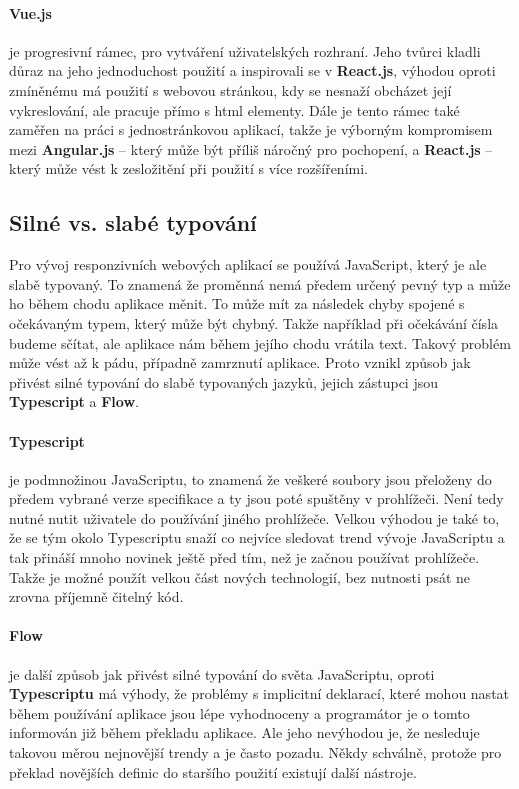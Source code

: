 \paragraph{Vue.js} je progresivní rámec, pro vytváření uživatelských rozhraní. Jeho tvůrci kladli důraz na jeho jednoduchost použití a inspirovali se v \textbf{React.js}, výhodou oproti zmíněnému má použití s webovou stránkou, kdy se nesnaží obcházet její vykreslování, ale pracuje přímo s html elementy. Dále je tento rámec také zaměřen na práci s jednostránkovou aplikací, takže je výborným kompromisem mezi \textbf{Angular.js} -- který může být příliš náročný pro pochopení, a \textbf{React.js} -- který může vést k zesložitění při použití s více rozšířeními. \cite{vue-js}

\subsection{Silné vs. slabé typování}
\par Pro vývoj responzivních webových aplikací se používá JavaScript, který je ale slabě typovaný. To znamená že proměnná nemá předem určený pevný typ a může ho během chodu aplikace měnit. To může mít za následek chyby spojené s očekávaným typem, který může být chybný. Takže například při očekávání čísla budeme sčítat, ale aplikace nám během jejího chodu vrátila text. Takový problém může vést až k pádu, případně zamrznutí aplikace. Proto vznikl způsob jak přivést silné typování do slabě typovaných jazyků, jejich zástupci jsou \textbf{Typescript} a \textbf{Flow}.

\paragraph{Typescript} je podmnožinou JavaScriptu, to znamená že veškeré soubory jsou přeloženy do předem vybrané verze specifikace a ty jsou poté spuštěny v prohlížeči. Není tedy nutné nutit uživatele do používání jiného prohlížeče. Velkou výhodou je také to, že se tým okolo Typescriptu snaží co nejvíce sledovat trend vývoje JavaScriptu a tak přináší mnoho novinek ještě před tím, než je začnou používat prohlížeče. Takže je možné použít velkou část nových technologií, bez nutnosti psát ne zrovna příjemně čitelný kód. \cite{typescript}

\paragraph{Flow} je další způsob jak přivést silné typování do světa JavaScriptu, oproti \textbf{Typescriptu} má výhody, že problémy s implicitní deklarací, které mohou nastat během používání aplikace jsou lépe vyhodnoceny a programátor je o tomto informován již během překladu aplikace. Ale jeho nevýhodou je, že nesleduje takovou měrou nejnovější trendy a je často pozadu. Někdy schválně, protože pro překlad novějších definic do staršího použití existují další nástroje. \cite{flow}

